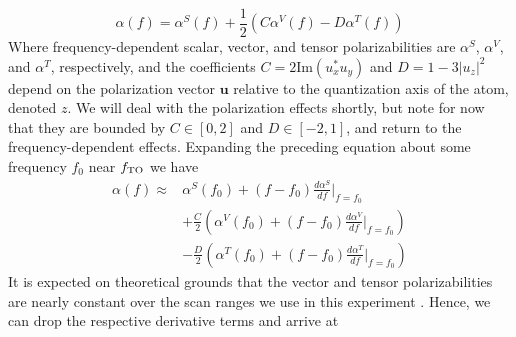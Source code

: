 	\begin{equation}
		 \alpha(f) = \alpha^S(f) + \frac{1}{2}\left(C\alpha^V(f)  - D\alpha^T(f)\right)
		 \label{eqn:master_polz}
	\end{equation}
	Where frequency-dependent scalar, vector, and tensor polarizabilities are $\alpha^S$, $\alpha^V$, and $\alpha^T$, respectively, and the coefficients $C = 2\mathrm{Im}(u_{x}^*u_y)$ and $D = 1 - 3|u_z|^2$ depend on the polarization vector $\mathbf{u}$ relative to the quantization axis of the atom, denoted $z$. 
	We will deal with the polarization effects shortly, but note for now that they are bounded by $C\in[0,2]$ and $D\in[-2,1]$, and return to the frequency-dependent effects.
	Expanding the preceding equation about some frequency $f_0$ near $f_\mathrm{TO}$ we have
	\begin{align}
		 \alpha(f)  \approx & \alpha^S(f_0) + (f-f_0)\frac{d\alpha^S}{df}\Bigr|_{f=f_0} \\
		 &+ \frac{C}{2}\left(\alpha^V(f_0) + (f-f_0)\frac{d\alpha^V}{df}\Bigr|_{f=f_0} \right)\\
		 &-\frac{D}{2}\left(\alpha^T(f_0) + (f-f_0)\frac{d\alpha^T}{df}\Bigr|_{f=f_0} \right)
	\end{align}
	It is expected on theoretical grounds that the vector and tensor polarizabilities are nearly constant over the scan ranges we use in this experiment \cite{ArxivTO}.
	Hence, we can drop the respective derivative terms and arrive at

